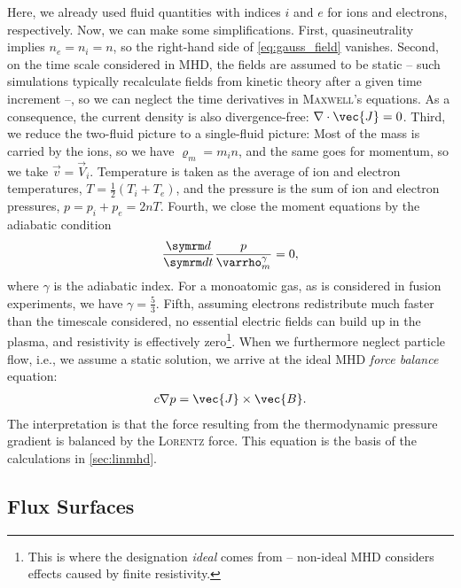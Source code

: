 Here, we already used fluid quantities with indices $i$ and $e$ for ions and electrons, respectively. Now, we can make some simplifications. First, quasineutrality implies $n_{e} = n_{i} = n$, so the right-hand side of \cref{eq:gauss_field} vanishes. Second, on the time scale considered in MHD, the fields are assumed to be static -- such simulations typically recalculate fields from kinetic theory after a given time increment --, so we can neglect the time derivatives in \textsc{Maxwell}'s equations. As a consequence, the current density is also divergence-free: $\divg \vec{J} = 0$. Third, we reduce the two-fluid picture to a single-fluid picture: Most of the mass is carried by the ions, so we have $\varrho_{m} = m_{i} n$, and the same goes for momentum, so we take $\vec{v} = \vec{V}_{i}$. Temperature is taken as the average of ion and electron temperatures, $T = \frac{1}{2} (T_{i} + T_{e})$, and the pressure is the sum of ion and electron pressures, $p = p_{i} + p_{e} = 2 n T$. Fourth, we close the moment equations by the adiabatic condition
\begin{gather}
  \frac{\diff}{\diff t} \frac{p}{\varrho_{m}^{\gamma}} = 0,
\end{gather}
where $\gamma$ is the adiabatic index. For a monoatomic gas, as is considered in fusion experiments, we have $\gamma = \frac{5}{3}$. Fifth, assuming electrons redistribute much faster than the timescale considered, no essential electric fields can build up in the plasma, and resistivity is effectively zero\footnote{This is where the designation \emph{ideal} comes from -- non-ideal MHD considers effects caused by finite resistivity.}. When we furthermore neglect particle flow, i.e., we assume a static solution, we arrive at the ideal MHD \emph{force balance} equation:
\begin{gather}
  c \grad p = \vec{J} \times \vec{B}. \label{eq:ideal-mhd}
\end{gather}
The interpretation is that the force resulting from the thermodynamic pressure gradient is balanced by the \textsc{Lorentz} force. This equation is the basis of the calculations in \cref{sec:linmhd}.

\subsection{Flux Surfaces}

